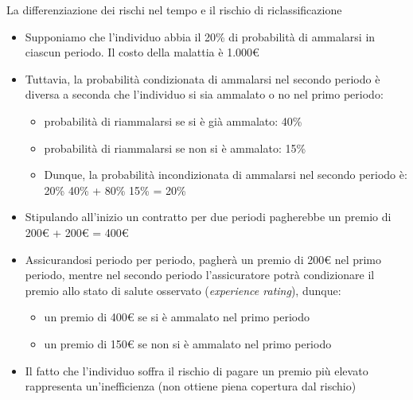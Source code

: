 \documentclass[aspectratio=149,11pt]{beamer}
\begin{document}
\begin{frame}{La differenziazione dei rischi nel tempo e il rischio di riclassificazione}
\small
\begin{itemize}
\item Supponiamo che l'individuo abbia il 20\% di probabilità di ammalarsi in
ciascun periodo. Il costo della malattia è 1.000€
\item Tuttavia, la probabilità \alert{condizionata} di ammalarsi nel secondo periodo è
diversa a seconda che l'individuo si sia ammalato o no nel primo periodo:
\begin{itemize}
\item probabilità di riammalarsi se si è già ammalato: 40\%
\item probabilità di riammalarsi se non si è ammalato: 15\%
\item Dunque, la probabilità incondizionata di ammalarsi nel secondo periodo è:\\[0pt]
20\% \texttimes{} 40\% + 80\% \texttimes{} 15\% = 20\%
\end{itemize}
\item Stipulando all'inizio un contratto per due periodi pagherebbe un premio di
200€ + 200€ = 400€
\item Assicurandosi periodo per periodo, pagherà un premio di 200€ nel primo
periodo, mentre nel secondo periodo l'assicuratore potrà condizionare il
premio allo stato di salute osservato (\emph{experience rating}), dunque:
\begin{itemize}
\item un premio di 400€ se si è ammalato nel primo periodo
\item un premio di 150€ se non si è ammalato nel primo periodo
\end{itemize}
\item Il fatto che l'individuo soffra il rischio di pagare un premio più elevato
rappresenta un'\alert{inefficienza} (non ottiene piena copertura dal rischio)
\end{itemize}
\end{frame}
\end{document}
